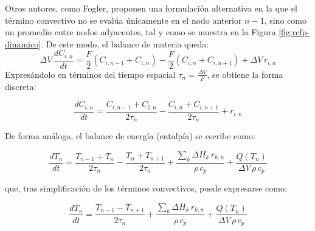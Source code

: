\noindent Otros autores, como Fogler, proponen una formulación alternativa en la que el término convectivo no se evalúa únicamente en el nodo anterior \(n-1\), sino como un promedio entre nodos adyacentes, tal y como se muestra en la Figura \ref{fig:rcfp-dinamico}. De este modo, el balance de materia queda:
\vspace{1em}
\begin{equation}
    \Delta V \,\frac{d C_{i,n}}{d t}
    =
    \frac{F}{2}\left(C_{i,n-1}+C_{i,n}\right)
    -
    \frac{F}{2}\left(C_{i,n}+C_{i,n+1}\right)
    +
    \Delta V\, r_{i,n}
    \label{eq:rcfp-discreto2}
\end{equation}
\vspace{0.5em}
\noindent Expresándolo en términos del tiempo espacial \( \tau_n = \frac{\Delta V}{F} \), se obtiene la forma discreta:
\vspace{0.5em}

\begin{equation}
    \frac{d C_{i,n}}{d t}
    =
    \frac{C_{i,n-1}+C_{i,n}}{2\tau_n}
    -
    \frac{C_{i,n}+C_{i,n+1}}{2\tau_n}
    +
    r_{i,n}
    \label{eq:rcfp-discreto3}
\end{equation}

\vspace{0.5em}
\noindent De forma análoga, el balance de energía (entalpía) se escribe como:

\vspace{0.5em}

\begin{equation}
    \frac{dT_n}{dt}
    =
    \frac{T_{n-1}+T_n}{2\tau_n}
    -
    \frac{T_n+T_{n+1}}{2\tau_n}
    +
    \frac{\sum_k \Delta H_k \, r_{k,n}}{\rho \, c_p}
    +
    \frac{Q(T_n)}{\Delta V \, \rho \, c_p}
    \label{eq:rcfp-discreto4}
\end{equation}

\vspace{0.5em}

\noindent que, tras simplificación de los términos convectivos, puede expresarse como:

\vspace{0.5em}

\begin{equation}
    \frac{dT_n}{dt}
    =
    \frac{T_{n-1}-T_{n+1}}{2\tau_n}
    +
    \frac{\sum_k \Delta H_k \, r_{k,n}}{\rho \, c_p}
    +
    \frac{Q(T_n)}{\Delta V \, \rho \, c_p}
    \label{eq:rcfp-discreto5}
\end{equation}
\newpage
